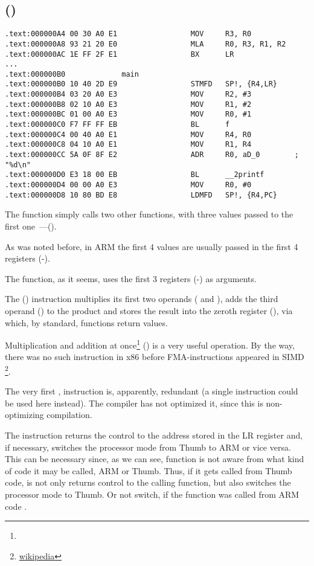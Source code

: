 \subsection{\NonOptimizingKeilVI (\ARMMode)}

\begin{lstlisting}
.text:000000A4 00 30 A0 E1                 MOV     R3, R0
.text:000000A8 93 21 20 E0                 MLA     R0, R3, R1, R2
.text:000000AC 1E FF 2F E1                 BX      LR
...
.text:000000B0             main
.text:000000B0 10 40 2D E9                 STMFD   SP!, {R4,LR}
.text:000000B4 03 20 A0 E3                 MOV     R2, #3
.text:000000B8 02 10 A0 E3                 MOV     R1, #2
.text:000000BC 01 00 A0 E3                 MOV     R0, #1
.text:000000C0 F7 FF FF EB                 BL      f
.text:000000C4 00 40 A0 E1                 MOV     R4, R0
.text:000000C8 04 10 A0 E1                 MOV     R1, R4
.text:000000CC 5A 0F 8F E2                 ADR     R0, aD_0        ; "%d\n"
.text:000000D0 E3 18 00 EB                 BL      __2printf
.text:000000D4 00 00 A0 E3                 MOV     R0, #0
.text:000000D8 10 80 BD E8                 LDMFD   SP!, {R4,PC}
\end{lstlisting}

The \main function simply calls two other functions, with three values passed to the 
first one~---(\ttf).

As was noted before, in ARM the first 4 values are usually passed in the first 4 registers (-).

The \ttf function, as it seems, uses the first 3 registers (-) as arguments.

The  () 
instruction multiplies its first two operands ( and ), adds the third operand () to the product and stores
the result into the zeroth register (), via which, by standard, functions return values.

Multiplication and addition at once\footnote{\WPMAO} () 
is a very useful operation. By the way, there was no such instruction in x86 
before FMA-instructions appeared in SIMD
\footnote{\href{http://go.yurichev.com/17103}{wikipedia}}.

The very first , 
instruction is, apparently, redundant (a single  instruction could be used here instead). 
The compiler has not optimized it, since this is non-optimizing compilation.


The  instruction returns the control to the address stored in the \ac{LR} register and, if necessary, 
switches the processor mode from Thumb to ARM or vice versa.
This can be necessary since, as we can see, function \ttf is not aware from what kind of code it may be
called, ARM or Thumb.
Thus, if it gets called from Thumb code, 
 is not only returns control to the calling function,
but also switches the processor mode to Thumb.
Or not switch, if the function was called from ARM code \cite[A2.3.2]{ARMref}.
